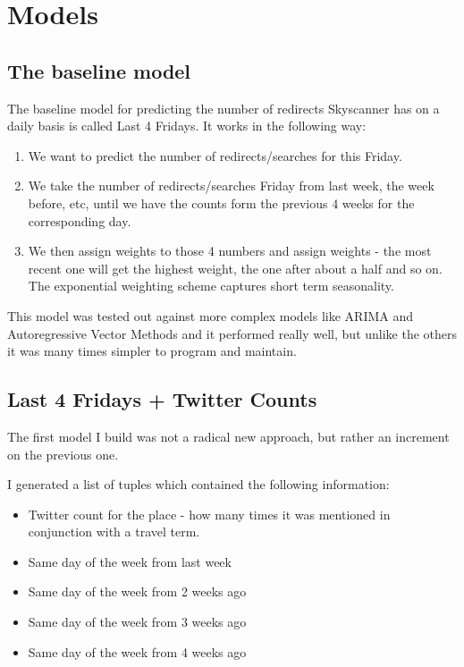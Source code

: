 \documentclass[minf,frontabs,twoside,singlespacing,parskip]{infthesis}
\begin{document}
\chapter{Models}
\label{chap:model}

\section{The baseline model}
\label{sec:baseline}

The baseline model for predicting the number of redirects Skyscanner has on a daily basis is called Last 4 Fridays. 
It works in the following way:
\begin{enumerate}
\item We want to predict the number of redirects/searches for this Friday.
\item We take the number of redirects/searches Friday from last week, the week before, etc, until we have the counts form the previous 4 weeks for the corresponding day.
\item We then assign weights to those 4 numbers and assign weights - the most recent one will get the highest weight, the one after about a half and so on. The exponential weighting scheme captures short term seasonality.
\end{enumerate}

This model was tested out against more complex models like ARIMA and Autoregressive Vector Methods and it performed really well, but unlike the others it was many times simpler to program and maintain.

\section{Last 4 Fridays + Twitter Counts}

The first model I build was not a radical new approach, but rather an increment on the previous one.

I generated a list of tuples which contained the following information:
\begin{itemize}
\item Twitter count for the place - how many times it was mentioned in conjunction with a travel term.
\item Same day of the week from last week
\item Same day of the week from 2 weeks ago
\item Same day of the week from 3 weeks ago
\item Same day of the week from 4 weeks ago
\end{itemize}
\end{document}
